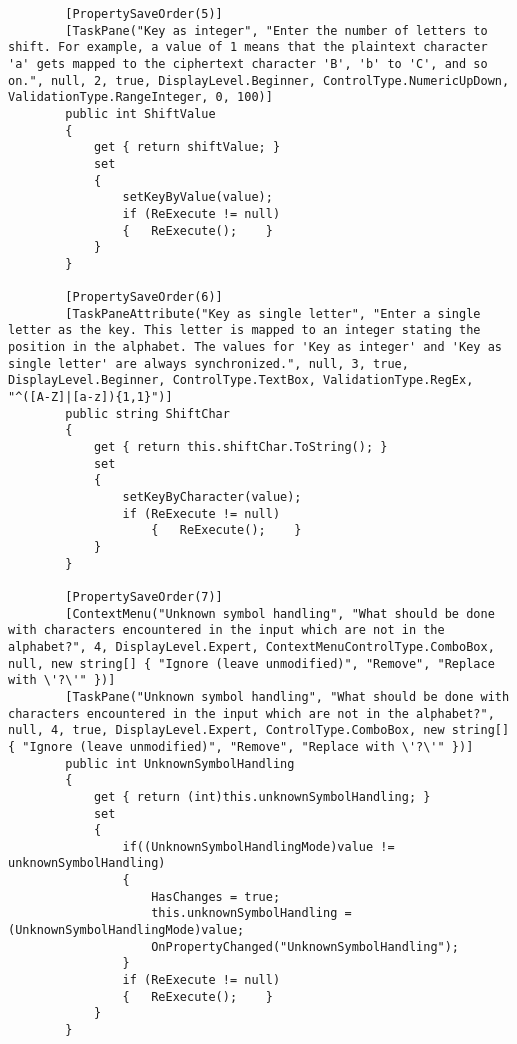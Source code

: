 \begin{lstlisting}
        [PropertySaveOrder(5)]
        [TaskPane("Key as integer", "Enter the number of letters to shift. For example, a value of 1 means that the plaintext character 'a' gets mapped to the ciphertext character 'B', 'b' to 'C', and so on.", null, 2, true, DisplayLevel.Beginner, ControlType.NumericUpDown, ValidationType.RangeInteger, 0, 100)]
        public int ShiftValue
        {
            get { return shiftValue; }
            set
            {
                setKeyByValue(value);
                if (ReExecute != null)
                {	ReExecute();	}
            }
        }

        [PropertySaveOrder(6)]
        [TaskPaneAttribute("Key as single letter", "Enter a single letter as the key. This letter is mapped to an integer stating the position in the alphabet. The values for 'Key as integer' and 'Key as single letter' are always synchronized.", null, 3, true, DisplayLevel.Beginner, ControlType.TextBox, ValidationType.RegEx, "^([A-Z]|[a-z]){1,1}")]
        public string ShiftChar
        {
            get { return this.shiftChar.ToString(); }
            set
            {
                setKeyByCharacter(value);
                if (ReExecute != null)
	                {   ReExecute();    }
            }
        }

        [PropertySaveOrder(7)]
        [ContextMenu("Unknown symbol handling", "What should be done with characters encountered in the input which are not in the alphabet?", 4, DisplayLevel.Expert, ContextMenuControlType.ComboBox, null, new string[] { "Ignore (leave unmodified)", "Remove", "Replace with \'?\'" })]
        [TaskPane("Unknown symbol handling", "What should be done with characters encountered in the input which are not in the alphabet?", null, 4, true, DisplayLevel.Expert, ControlType.ComboBox, new string[] { "Ignore (leave unmodified)", "Remove", "Replace with \'?\'" })]
        public int UnknownSymbolHandling
        {
            get { return (int)this.unknownSymbolHandling; }
            set
            {
                if((UnknownSymbolHandlingMode)value != unknownSymbolHandling)
                {
                	HasChanges = true;
	                this.unknownSymbolHandling = (UnknownSymbolHandlingMode)value;
    	            OnPropertyChanged("UnknownSymbolHandling");
				}
                if (ReExecute != null) 
                {	ReExecute();	}
            }
        }


\end{lstlisting}

